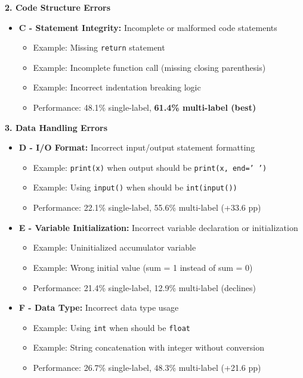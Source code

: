 \documentclass[12pt,a4paper]{article}
\begin{document}
\textbf{2. Code Structure Errors}
\begin{itemize}[leftmargin=*]
    \item \textbf{C - Statement Integrity:} Incomplete or malformed code statements
    \begin{itemize}
        \item Example: Missing \texttt{return} statement
        \item Example: Incomplete function call (missing closing parenthesis)
        \item Example: Incorrect indentation breaking logic
        \item Performance: 48.1\% single-label, \textbf{61.4\% multi-label (best)}
    \end{itemize}
\end{itemize}

\textbf{3. Data Handling Errors}
\begin{itemize}[leftmargin=*]
    \item \textbf{D - I/O Format:} Incorrect input/output statement formatting
    \begin{itemize}
        \item Example: \texttt{print(x)} when output should be \texttt{print(x, end=' ')}
        \item Example: Using \texttt{input()} when should be \texttt{int(input())}
        \item Performance: 22.1\% single-label, 55.6\% multi-label (+33.6 pp)
    \end{itemize}
    
    \item \textbf{E - Variable Initialization:} Incorrect variable declaration or initialization
    \begin{itemize}
        \item Example: Uninitialized accumulator variable
        \item Example: Wrong initial value (sum = 1 instead of sum = 0)
        \item Performance: 21.4\% single-label, 12.9\% multi-label (declines)
    \end{itemize}
    
    \item \textbf{F - Data Type:} Incorrect data type usage
    \begin{itemize}
        \item Example: Using \texttt{int} when should be \texttt{float}
        \item Example: String concatenation with integer without conversion
        \item Performance: 26.7\% single-label, 48.3\% multi-label (+21.6 pp)
    \end{itemize}
\end{itemize}
\end{document}
